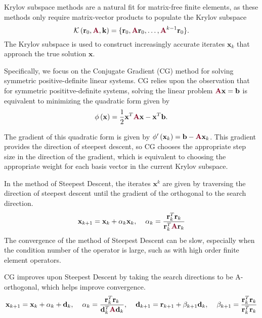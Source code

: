 Krylov subspace methods are a natural fit for matrix-free finite elements, as these methods only require matrix-vector products to populate the Krylov subspace
\begin{equation}
\mathcal{K} \left( \mathbf{r}_0, {\color{burgundy}\mathbf{A}}, \mathbf{k} \right) = \lbrace \mathbf{r}_0, {\color{burgundy}\mathbf{A}} \mathbf{r}_0, \dots, {\color{burgundy}\mathbf{A}}^{k - 1} \mathbf{r}_0 \rbrace.
\label{krylov_space}
\end{equation}
The Krylov subspace is used to construct increasingly accurate iterates $\mathbf{x}_k$ that approach the true solution $\mathbf{x}$.

Specifically, we focus on the Conjugate Gradient (CG) method \cite{hestenes1952methods, shewchuk1994introduction} for solving symmetric positive-definite linear systems.
CG relies upon the observation that for symmetric posititve-definite systems, solving the linear problem ${\color{burgundy}\mathbf{A}} \mathbf{x} = \mathbf{b}$ is equivalent to minimizing the quadratic form given by
\begin{equation}
\phi \left( \mathbf{x} \right) = \frac{1}{2} \mathbf{x}^T {\color{burgundy}\mathbf{A}} \mathbf{x} - \mathbf{x}^T \mathbf{b}.
\end{equation}

The gradient of this quadratic form is given by $\phi' \left( \mathbf{x}_k \right) = \mathbf{b} - {\color{burgundy}\mathbf{A}} \mathbf{x}_k$.
This gradient provides the direction of steepest descent, so CG chooses the appropriate step size in the direction of the gradient, which is equivalent to choosing the appropriate weight for each basis vector in the current Krylov subspace.

In the method of Steepest Descent, the iterates $\mathbf{x}^k$ are given by traversing the direction of steepest descent until the gradient of the orthogonal to the search direction.
\begin{equation}
\mathbf{x}_{k + 1} = \mathbf{x}_k + \alpha_k \mathbf{x}_k, \hspace{4mm}
\alpha_k = \frac{\mathbf{r}_k^T \mathbf{r}_k}{\mathbf{r}_k^T {\color{burgundy}\mathbf{A}} \mathbf{r}_k}
\end{equation}
The convergence of the method of Steepest Descent can be slow, especially when the condition number of the operator is large, such as with high order finite element operators.

CG improves upon Steepest Descent by taking the search directions to be A-orthogonal, which helps improve convergence.
\begin{equation}
\mathbf{x}_{k + 1} = \mathbf{x}_k + \alpha_k + \mathbf{d}_k, \hspace{4mm}
\alpha_k  = \frac{\mathbf{r}_k^T \mathbf{r}_k}{\mathbf{d}_k^T {\color{burgundy}\mathbf{A}} \mathbf{d}_k}, \hspace{4mm}
\mathbf{d}_{k + 1} = \mathbf{r}_{k + 1} + \beta_{k + 1} \mathbf{d}_k, \hspace{4mm}
\beta_{k + 1} = \frac{\mathbf{r}_k^T \mathbf{r}_k}{\mathbf{r}_k^T \mathbf{r}_k}
\end{equation}

